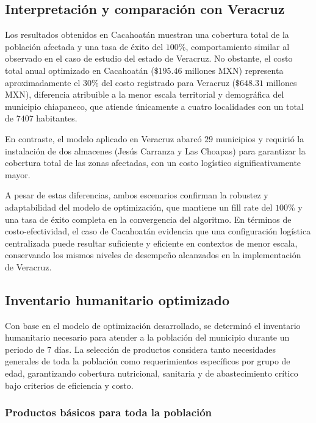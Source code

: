 \documentclass[
  spanish,
  us-letterpaper,
  DIV=11,
  numbers=noendperiod]{scrreprt}
\numberwithin{equation}{section}
\begin{document}
\subsection{Interpretación y comparación con
Veracruz}\label{interpretaciuxf3n-y-comparaciuxf3n-con-veracruz}

Los resultados obtenidos en Cacahoatán muestran una cobertura total de
la población afectada y una tasa de éxito del \(100\%\), comportamiento
similar al observado en el caso de estudio del estado de Veracruz. No
obstante, el costo total anual optimizado en Cacahoatán (\(\$195.46\)
millones MXN) representa aproximadamente el \(30\%\) del costo
registrado para Veracruz (\(\$648.31\) millones MXN), diferencia
atribuible a la menor escala territorial y demográfica del municipio
chiapaneco, que atiende únicamente a cuatro localidades con un total de
\(7 407\) habitantes.

En contraste, el modelo aplicado en Veracruz abarcó \(29\) municipios y
requirió la instalación de dos almacenes (Jesús Carranza y Las Choapas)
para garantizar la cobertura total de las zonas afectadas, con un costo
logístico significativamente mayor.

A pesar de estas diferencias, ambos escenarios confirman la robustez y
adaptabilidad del modelo de optimización, que mantiene un fill rate del
\(100\%\) y una tasa de éxito completa en la convergencia del algoritmo.
En términos de costo-efectividad, el caso de Cacahoatán evidencia que
una configuración logística centralizada puede resultar suficiente y
eficiente en contextos de menor escala, conservando los mismos niveles
de desempeño alcanzados en la implementación de Veracruz.

\subsection{Inventario humanitario
optimizado}\label{inventario-humanitario-optimizado}

Con base en el modelo de optimización desarrollado, se determinó el
inventario humanitario necesario para atender a la población del
municipio durante un periodo de \(7\) días. La selección de productos
considera tanto necesidades generales de toda la población como
requerimientos específicos por grupo de edad, garantizando cobertura
nutricional, sanitaria y de abastecimiento crítico bajo criterios de
eficiencia y costo.

\subsubsection{Productos básicos para toda la
población}\label{productos-buxe1sicos-para-toda-la-poblaciuxf3n}
\end{document}
